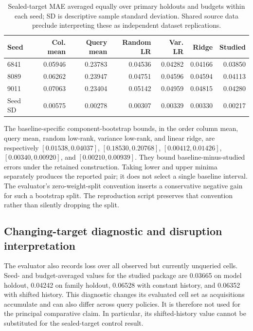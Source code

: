 \documentclass{article}
\begin{document}
\begin{table}[h]
\centering
\small

\begin{tabular}{lrrrrrr}
\toprule
Seed & Col. mean & Query mean & Random LR & Var. LR & Ridge & Studied \\
\midrule
6841 & 0.05946 & 0.23783 & 0.04536 & 0.04282 & 0.04166 & 0.03850 \\
8089 & 0.06262 & 0.23947 & 0.04751 & 0.04596 & 0.04594 & 0.04113 \\
9011 & 0.07063 & 0.23404 & 0.05142 & 0.04959 & 0.04815 & 0.04280 \\
\midrule
Seed SD & 0.00575 & 0.00278 & 0.00307 & 0.00339 & 0.00330 & 0.00217 \\
\bottomrule
\end{tabular}
\caption{Sealed-target MAE averaged equally over primary holdouts and budgets within each seed; SD is descriptive sample standard deviation. Shared source data preclude interpreting these as independent dataset replications.}
\end{table}

The baseline-specific component-bootstrap bounds, in the order column mean, query mean, random low-rank, variance low-rank, and linear ridge, are respectively $[0.01538,0.04037]$, $[0.18530,0.20768]$, $[0.00412,0.01426]$, $[0.00340,0.00920]$, and $[0.00210,0.00939]$. They bound baseline-minus-studied errors under the retained construction. Taking lower and upper minima separately produces the reported pair; it does not select a single baseline interval. The evaluator's zero-weight-split convention inserts a conservative negative gain for such a bootstrap split. The reproduction script preserves that convention rather than silently dropping the split.

\subsection{Changing-target diagnostic and disruption interpretation}
The evaluator also records loss over all observed but currently unqueried cells. Seed- and budget-averaged values for the studied package are 0.03665 on model holdout, 0.04242 on family holdout, 0.06528 with constant history, and 0.06352 with shifted history. This diagnostic changes its evaluated cell set as acquisitions accumulate and can also differ across query policies. It is therefore not used for the principal comparative claim. In particular, its shifted-history value cannot be substituted for the sealed-target control result.
\end{document}

